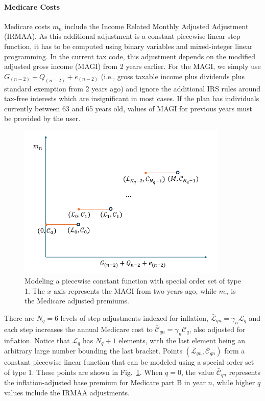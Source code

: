 \documentclass{report}[fleqn,11pt]
\begin{document}
\paragraph*{Medicare Costs}
	Medicare costs $m_n$ include the Income Related Monthly Adjusted Adjustment (IRMAA).
	As this additional adjustment
	is a constant piecewise linear step function,
        it has to be computed using binary variables and mixed-integer linear
	programming. In the current tax code, this adjustment
	depends on the modified adjusted gross income (MAGI) from 2 years earlier. For the
	MAGI, we simply use $G_{(n-2)} + Q_{(n-2)} + e_{(n-2)}$ (i.e., gross taxable income
	plus dividends plus standard exemption from 2 years ago) and ignore the additional IRS
	rules around tax-free interests which are insignificant in most cases. If the plan
        has individuals currently between 63 and 65 years old, values of MAGI for previous years
	must be provided by the user.
	\begin{figure}[t]
	    \center\includegraphics[width=10cm]{piecewiseConstant.png}
	    \caption{\small Modeling a piecewise constant function with special order set of type 1.
	    The $x$-axis represents the MAGI from two years ago, while $m_n$ is the Medicare adjusted premiums.
	    \label{Fig:piecewise}}
	\end{figure}

	There are $N_q=6$ levels
	of step adjustments indexed for inflation,
	$\bar{\mathcal{L}}_{qn} = \gamma_n\mathcal{L}_q$ and each step increases
	the annual Medicare
	cost to $\bar{\mathcal{C}}_{qn} = \gamma_n\mathcal{C}_q$, also adjusted for inflation.
	Notice that $\mathcal{L}_q$ has $N_q + 1$ elements, with the last element
	being an arbitrary large number bounding the last bracket.
        Points $(\bar{\mathcal{L}}_{qn}, \bar{\mathcal{C}}_{qn})$ form a constant piecewise
	linear function that can be modeled using a special order set of type 1.
	These points are shown in Fig.~\ref{Fig:piecewise}. When $q=0$, 
	the value $\bar{\mathcal{C}}_{qn}$
	represents the inflation-adjusted base premium for Medicare part B in year $n$, while
	higher $q$ values include the IRMAA adjustments.
\end{document}
